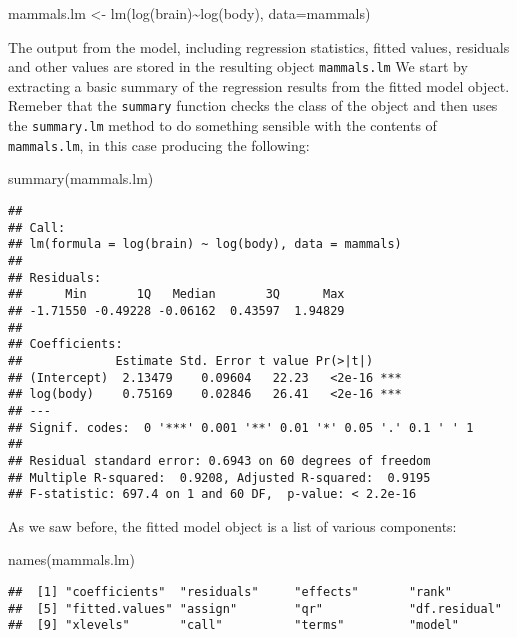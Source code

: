 \documentclass[
]{article}
\newenvironment{Shaded}{\begin{snugshade}}{\end{snugshade}}
\newcommand{\AttributeTok}[1]{\textcolor[rgb]{0.77,0.63,0.00}{#1}}
\newcommand{\FunctionTok}[1]{\textcolor[rgb]{0.00,0.00,0.00}{#1}}
\newcommand{\NormalTok}[1]{#1}
\newcommand{\OtherTok}[1]{\textcolor[rgb]{0.56,0.35,0.01}{#1}}
\newcommand{\SpecialCharTok}[1]{\textcolor[rgb]{0.00,0.00,0.00}{#1}}
\begin{document}
\begin{Shaded}
\begin{Highlighting}[]
\NormalTok{mammals.lm }\OtherTok{\textless{}{-}} \FunctionTok{lm}\NormalTok{(}\FunctionTok{log}\NormalTok{(brain)}\SpecialCharTok{\textasciitilde{}}\FunctionTok{log}\NormalTok{(body), }\AttributeTok{data=}\NormalTok{mammals)}
\end{Highlighting}
\end{Shaded}

The output from the model, including regression statistics, fitted
values, residuals and other values are stored in the resulting object
\texttt{mammals.lm} We start by extracting a basic summary of the
regression results from the fitted model object. Remeber that the
\texttt{summary} function checks the class of the object and then uses
the \texttt{summary.lm} method to do something sensible with the
contents of \texttt{mammals.lm}, in this case producing the following:

\begin{Shaded}
\begin{Highlighting}[]
\FunctionTok{summary}\NormalTok{(mammals.lm)}
\end{Highlighting}
\end{Shaded}

\begin{verbatim}
## 
## Call:
## lm(formula = log(brain) ~ log(body), data = mammals)
## 
## Residuals:
##      Min       1Q   Median       3Q      Max 
## -1.71550 -0.49228 -0.06162  0.43597  1.94829 
## 
## Coefficients:
##             Estimate Std. Error t value Pr(>|t|)    
## (Intercept)  2.13479    0.09604   22.23   <2e-16 ***
## log(body)    0.75169    0.02846   26.41   <2e-16 ***
## ---
## Signif. codes:  0 '***' 0.001 '**' 0.01 '*' 0.05 '.' 0.1 ' ' 1
## 
## Residual standard error: 0.6943 on 60 degrees of freedom
## Multiple R-squared:  0.9208, Adjusted R-squared:  0.9195 
## F-statistic: 697.4 on 1 and 60 DF,  p-value: < 2.2e-16
\end{verbatim}

As we saw before, the fitted model object is a list of various
components:

\begin{Shaded}
\begin{Highlighting}[]
\FunctionTok{names}\NormalTok{(mammals.lm)   }
\end{Highlighting}
\end{Shaded}

\begin{verbatim}
##  [1] "coefficients"  "residuals"     "effects"       "rank"         
##  [5] "fitted.values" "assign"        "qr"            "df.residual"  
##  [9] "xlevels"       "call"          "terms"         "model"
\end{verbatim}
\end{document}

